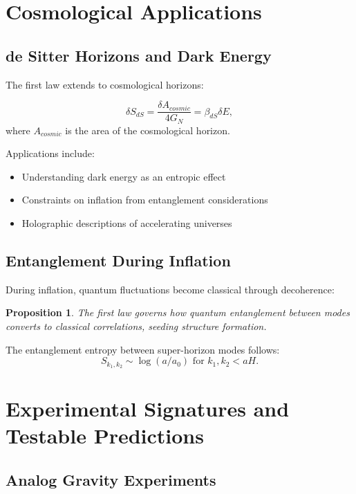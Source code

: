 \documentclass[11pt,letterpaper]{article}
\newtheorem{proposition}[theorem]{Proposition}
\begin{document}
\section{Cosmological Applications}

\subsection{de Sitter Horizons and Dark Energy}

The first law extends to cosmological horizons:

\begin{equation}
\delta S_{dS} = \frac{\delta A_{cosmic}}{4G_N} = \beta_{dS} \delta E,
\end{equation}
where $A_{cosmic}$ is the area of the cosmological horizon.

Applications include:
\begin{itemize}
\item Understanding dark energy as an entropic effect
\item Constraints on inflation from entanglement considerations
\item Holographic descriptions of accelerating universes
\end{itemize}

\subsection{Entanglement During Inflation}

During inflation, quantum fluctuations become classical through decoherence:

\begin{proposition}
The first law governs how quantum entanglement between modes converts to classical correlations, seeding structure formation.
\end{proposition}

The entanglement entropy between super-horizon modes follows:
\begin{equation}
S_{k_1,k_2} \sim \log(a/a_0) \text{ for } k_1, k_2 < aH.
\end{equation}

\section{Experimental Signatures and Testable Predictions}

\subsection{Analog Gravity Experiments}
\end{document}
